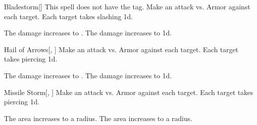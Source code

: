 \lowercase{\hypertarget{spell:Bladestorm}{}}\label{spell:Bladestorm}
\begin{freeability}[Rank 3]{\hypertarget{spell:Bladestorm}{Bladestorm}}[]
This spell does not have the  tag.
Make an attack vs. Armor against each target.
\hit Each target takes slashing  \minus1d.

\rankline
{} The damage increases to .
 The damage increases to  \plus1d.
\end{freeability}
\vspace{0.25em}



\lowercase{\hypertarget{spell:Hail of Arrows}{}}\label{spell:Hail of Arrows}
\begin{freeability}[Rank 3]{\hypertarget{spell:Hail of Arrows}{Hail of Arrows}}[, ]
Make an attack vs. Armor against each target.
\hit Each target takes piercing  \minus1d.

\rankline
{} The damage increases to .
 The damage increases to  \plus1d.
\end{freeability}
\vspace{0.25em}



\lowercase{\hypertarget{spell:Missile Storm}{}}\label{spell:Missile Storm}
\begin{freeability}[Rank 3]{\hypertarget{spell:Missile Storm}{Missile Storm}}[, ]
Make an attack vs. Armor against each target.
\hit Each target takes piercing  \minus1d.

\rankline
{} The area increases to a \arealarge radius.
 The area increases to a \areahuge radius.
\end{freeability}
\vspace{0.25em}



